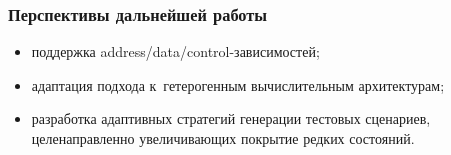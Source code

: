 \begin{frame}
  \frametitle{Перспективы дальнейшей работы}
  \begin{itemize}
    \item поддержка address/data/control-зависимостей;
    \item адаптация подхода к~гетерогенным вычислительным архитектурам;
    \item разработка адаптивных стратегий генерации тестовых сценариев,
      целенаправленно увеличивающих покрытие редких состояний.
  \end{itemize}
\end{frame}
